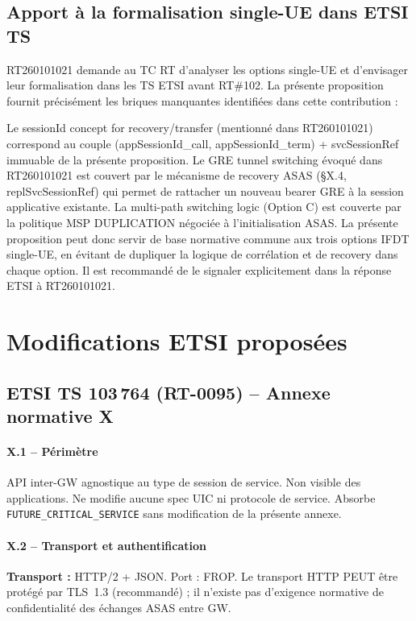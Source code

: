 \documentclass[11pt,a4paper]{article}
\begin{document}
\subsection{Apport à la formalisation single-UE dans ETSI TS}
RT260101021 demande au TC RT d'analyser les options single-UE et d'envisager leur formalisation dans les TS ETSI avant RT\#102. La présente proposition fournit précisément les briques manquantes identifiées dans cette contribution :

Le sessionId concept for recovery/transfer (mentionné dans RT260101021) correspond au couple (appSessionId\_call, appSessionId\_term) + svcSessionRef immuable de la présente proposition.
Le GRE tunnel switching évoqué dans RT260101021 est couvert par le mécanisme de recovery ASAS (§X.4, replSvcSessionRef) qui permet de rattacher un nouveau bearer GRE à la session applicative existante.
La multi-path switching logic (Option C) est couverte par la politique MSP DUPLICATION négociée à l'initialisation ASAS.
La présente proposition peut donc servir de base normative commune aux trois options IFDT single-UE, en évitant de dupliquer la logique de corrélation et de recovery dans chaque option. Il est recommandé de le signaler explicitement dans la réponse ETSI à RT260101021.

\section{Modifications ETSI proposées}

\subsection{ETSI TS 103\,764 (RT-0095) -- Annexe normative X}

\paragraph{X.1 -- Périmètre}
API inter-GW agnostique au type de session de service. Non visible des applications.
Ne modifie aucune spec UIC ni protocole de service. Absorbe \texttt{FUTURE\_CRITICAL\_SERVICE}
sans modification de la présente annexe.

\paragraph{X.2 -- Transport et authentification}

\textbf{Transport :} HTTP/2 + JSON. Port : FROP. Le transport HTTP PEUT être protégé
par TLS~1.3 (recommandé) ; il n'existe pas d'exigence normative de confidentialité
des échanges ASAS entre GW.
\end{document}
